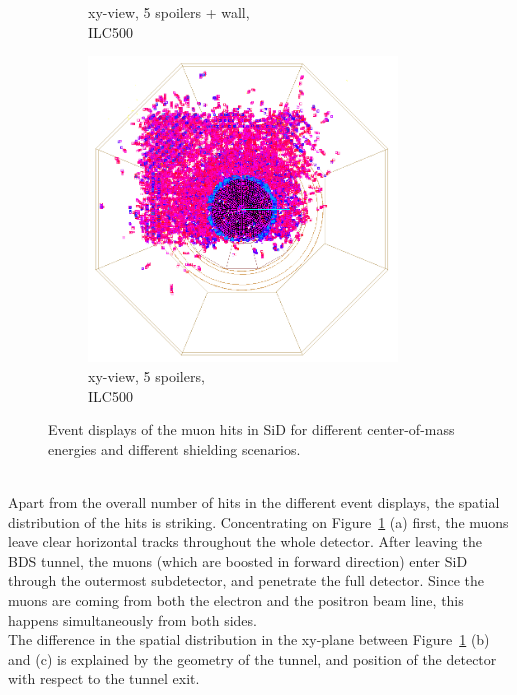 \begin{figure}[htbp]
\begin{subfigure}[b]{0.31\textwidth}
   \caption{xy-view, 5 spoilers + wall,\\ILC500}
   \end{subfigure}
   \hfill
    \begin{subfigure}[b]{0.31\textwidth}
   \centering
    \includegraphics[width=0.9\textwidth]{Figures/BDS_muons/muons_positron_5spoilers_2961_xyview_croped_inverted.png}
   \caption{xy-view, 5 spoilers,\\ILC500}
   \end{subfigure}
   \caption[Event displays of BDS muons in SiD]{Event displays of the muon hits in SiD for different center-of-mass energies and different shielding scenarios.}
   \label{fig:BDS_Muons:wired4}
 \end{figure}
\\Apart from the overall number of hits in the different event displays, the spatial distribution of the hits is striking.
Concentrating on Figure~\ref{fig:BDS_Muons:wired4} (a) first, the muons leave clear horizontal tracks throughout the whole detector.
After leaving the BDS tunnel, the muons (which are boosted in forward direction) enter SiD through the outermost subdetector, and penetrate the full detector.
Since the muons are coming from both the electron and the positron beam line, this happens simultaneously from both sides.
\\The difference in the spatial distribution in the xy-plane between Figure~\ref{fig:BDS_Muons:wired4} (b) and (c) is explained by the geometry of the tunnel, and position of the detector with respect to the tunnel exit.
